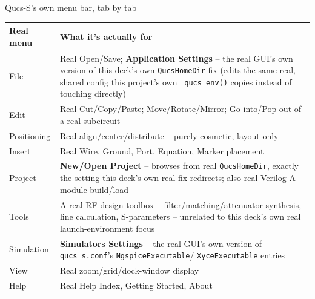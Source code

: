 \documentclass[aspectratio=169]{beamer}
\begin{document}
\begin{frame}[fragile]{Qucs-S's own menu bar, tab by tab}
\footnotesize

\begin{center}
\begin{tabularx}{\textwidth}{@{}p{}X@{}}
\toprule
\textbf{Real menu} & \textbf{What it's actually for} \\
\midrule

File &
Real Open/Save; \textbf{Application Settings} -- the real GUI's own
version of this deck's own \texttt{QucsHomeDir} fix
(edits the same real, shared config this project's own
\texttt{\_qucs\_env()} copies instead of touching directly) \\

Edit &
Real Cut/Copy/Paste; Move/Rotate/Mirror; Go into/Pop out of a
real subcircuit \\

Positioning &
Real align/center/distribute -- purely cosmetic, layout-only \\

Insert &
Real Wire, Ground, Port, Equation, Marker placement \\

Project &
\textbf{New/Open Project} -- browses from real \texttt{QucsHomeDir},
exactly the setting this deck's own real fix redirects; also real
Verilog-A module build/load \\

Tools &
A real RF-design toolbox -- filter/matching/attenuator synthesis,
line calculation, S-parameters -- unrelated to this deck's own real
launch-environment focus \\

Simulation &
\textbf{Simulators Settings} -- the real GUI's own version of
\texttt{qucs\_s.conf}'s \texttt{NgspiceExecutable}/
\texttt{XyceExecutable} entries \\

View &
Real zoom/grid/dock-window display \\

Help &
Real Help Index, Getting Started, About \\

\bottomrule
\end{tabularx}
\end{center}

\normalsize
\end{frame}

\end{document}
